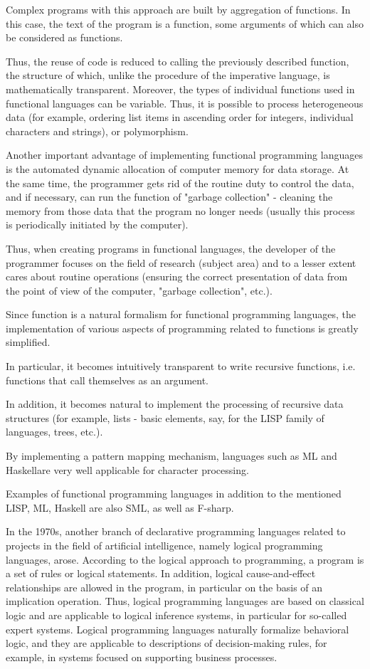 \documentclass[12pt]{book}
\begin{document}
Complex programs with this approach are built by aggregation of functions. In this case, the text of the program is a function, some arguments of which can also be considered as functions.

Thus, the reuse of code is reduced to calling the previously described function, the structure of which, unlike the procedure of the imperative language, is mathematically transparent. Moreover, the types of individual functions used in functional languages can be variable. Thus, it is possible to process heterogeneous data (for example, ordering list items in ascending order for integers, individual characters and strings), or polymorphism.

Another important advantage of implementing functional programming languages is the automated dynamic allocation of computer memory for data storage. At the same time, the programmer gets rid of the routine duty to control the data, and if necessary, can run the function of "garbage collection" - cleaning the memory from those data that the program no longer needs (usually this process is periodically initiated by the computer).

Thus, when creating programs in functional languages, the developer of the programmer focuses on the field of research (subject area) and to a lesser extent cares about routine operations (ensuring the correct presentation of data from the point of view of the computer, "garbage collection", etc.).

Since function is a natural formalism for functional programming languages, the implementation of various aspects of programming related to functions is greatly simplified.

In particular, it becomes intuitively transparent to write recursive functions, i.e.  functions that call themselves as an argument.

In addition, it becomes natural to implement the processing of recursive data structures (for example, lists - basic elements, say, for the LISP family of languages, trees, etc.).

By implementing a pattern mapping mechanism, languages such as ML and Haskellare very well applicable for character processing.

Examples of functional programming languages in addition to the mentioned LISP, ML, Haskell  are also SML, as well as F-sharp.

In the 1970s, another branch of declarative programming languages related to projects in the field of artificial intelligence, namely logical programming languages, arose. According to the logical approach to programming, a program is a set of rules or logical statements. In addition, logical cause-and-effect relationships are allowed in the program, in particular on the basis of an implication operation. Thus, logical programming languages are based on classical logic and are applicable to logical inference systems, in particular for so-called expert systems. Logical programming languages naturally formalize behavioral logic, and they are applicable to descriptions of decision-making rules, for example, in systems focused on supporting business processes.
\end{document}
